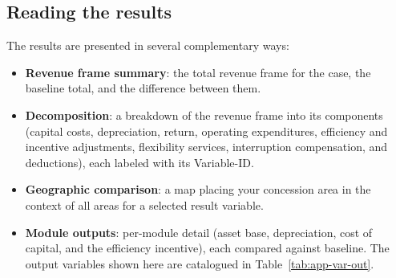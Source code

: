 \subsection{Reading the results}
The results are presented in several complementary ways:

\begin{itemize}
  \item \textbf{Revenue frame summary}: the total revenue frame for the case, the baseline total, and the difference between them.
  \item \textbf{Decomposition}: a breakdown of the revenue frame into its components (capital costs, depreciation, return, operating expenditures, efficiency and incentive adjustments, flexibility services, interruption compensation, and deductions), each labeled with its Variable-ID.
  \item \textbf{Geographic comparison}: a map placing your concession area in the context of all areas for a selected result variable.
  \item \textbf{Module outputs}: per-module detail (asset base, depreciation, cost of capital, and the efficiency incentive), each compared against baseline. The output variables shown here are catalogued in Table~\ref{tab:app-var-out}.
\end{itemize}

